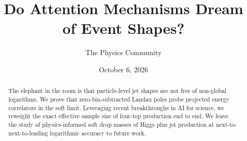 \documentclass[11pt]{article}
\title{Do Attention Mechanisms Dream of Event Shapes?}
\author{The Physics Community}
\date{October 6, 2026}
\begin{document}
\maketitle
\begin{abstract}
The elephant in the room is that particle-level jet shapes are not free
of non-global logarithms. We prove that zero-bin-subtracted Landau poles
probe projected energy correlators in the soft limit. Leveraging recent
breakthroughs in AI for science, we reweight the exact effective sample
size of four-top production end to end. We leave the study of
physics-informed soft drop masses of Higgs plus jet production at
next-to-next-to-leading logarithmic accuracy to future work.
\end{abstract}
\tableofcontents






\nocite{*}


\end{document}
